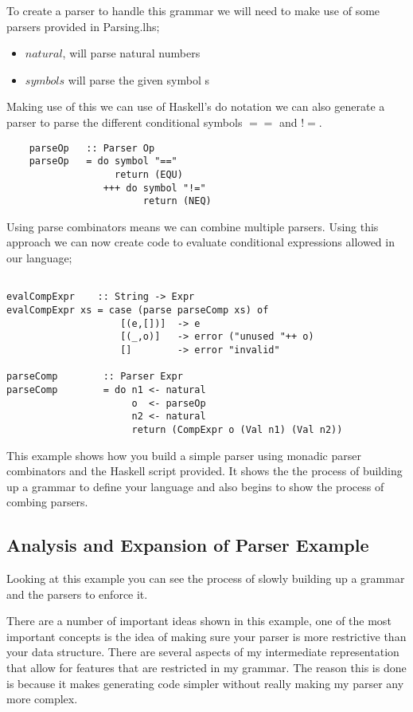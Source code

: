 To create a parser to handle this grammar we will need to make use of some parsers provided in Parsing.lhs;

\begin{itemize}
\item $natural$, will parse natural numbers
\item $symbol s$ will parse the given symbol s 
\end{itemize}

Making use of this we can use of Haskell's do notation we can also generate a parser to parse the different conditional symbols $==$ and $!=$. 

\begin{lstlisting}
	parseOp   :: Parser Op
	parseOp   = do symbol "=="
	               return (EQU)
        	     +++ do symbol "!="
	                    return (NEQ) 
\end{lstlisting} 

\newpage

Using parse combinators means we can combine multiple parsers. Using this approach we can now create code to evaluate conditional expressions allowed in our language;


\begin{lstlisting}

evalCompExpr    :: String -> Expr
evalCompExpr xs = case (parse parseComp xs) of
                    [(e,[])]  -> e
                    [(_,o)]   -> error ("unused "++ o)
                    []        -> error "invalid"

parseComp        :: Parser Expr	
parseComp        = do n1 <- natural
                      o  <- parseOp 
                      n2 <- natural
                      return (CompExpr o (Val n1) (Val n2))  
\end{lstlisting}

This example shows how you build a simple parser using monadic parser combinators and the Haskell script provided. It shows the the process of building up a grammar to define your language and also begins to show the process of combing parsers. 


\subsection{Analysis and Expansion of Parser Example}

Looking at this example you can see the process of slowly building up a grammar and the parsers to enforce it.

There are a number of important ideas shown in this example, one of the most important concepts is the idea of making sure your parser is more restrictive than your data structure. There are several aspects of my intermediate representation that allow for features that are restricted in my grammar. The reason this is done is because it makes generating code simpler without really making my parser any more complex.  

